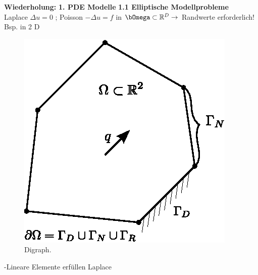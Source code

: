 \documentclass[12pt,twoside,reqno]{article}
\renewcommand{\Omega}{\bOmega}
\newcommand{\R}{\mathbb{R}}
\theoremstyle{TheoWieners}
\theoremstyle{break}
\theoremstyle{app}
\newtheorem{Spezielle Lösungen}[app]{Spezielle Lösungen}
\newtheorem{Spezielle Lösungen der Poisson-Gleichung}[app]{Spezielle Lösungen der Poisson-Gleichung}
\newtheorem{Kartesische Gitter in 2-d}[app]{Kartesische Gitter in 2-d}
\newtheorem{Diskretisierungen hoher Ordnung}[app]{Diskretisierungen hoher Ordnung}
\newtheorem{Zyklische Reduktion}[app]{Zyklische Reduktion}
\begin{document}
          
          
          
          
          
          
          
          \textbf{Wiederholung:}
          \textbf{1. PDE Modelle}
          \textbf{1.1 Elliptische Modellprobleme} \\Laplace $\Delta u = 0$ ; Poisson $-\Delta u = f$ in $\Omega \subset \R^D \rightarrow$ Randwerte erforderlich! Bsp. in 2 D\\ \begin{figure}[H]
\centering
\includegraphics[scale=.7]{grafik/Zeichnung-2.eps}
\caption{Digraph.}
\label{fig:digraph}
\end{figure} -Lineare Elemente erfüllen Laplace
\end{document}
